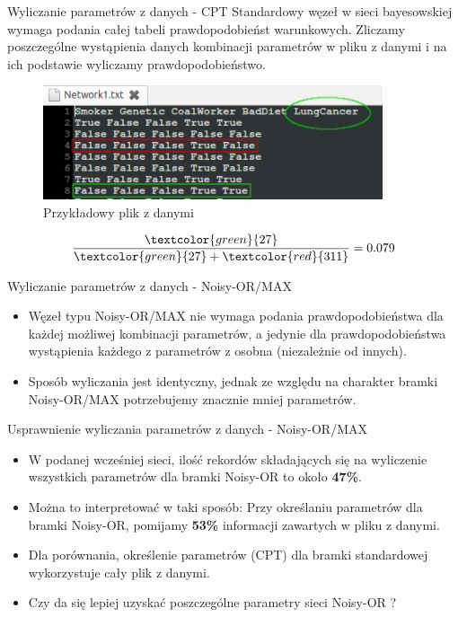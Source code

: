 \documentclass{beamer}
\begin{document}
\begin{frame}{Wyliczanie parametrów z danych - CPT}
	Standardowy węzeł w sieci bayesowskiej wymaga podania całej tabeli prawdopodobieńst warunkowych. 
	Zliczamy poszczególne wystąpienia danych kombinacji parametrów w pliku z danymi i na ich podstawie wyliczamy prawdopodobieństwo.

	\begin{figure}[h!]
		\centering
		\includegraphics[width=10cm]{4.png}
		\caption{Przykładowy plik z danymi}
	\end{figure}
	\begin{equation}
	\frac{\textcolor{green}{27}}{\textcolor{green}{27} + \textcolor{red}{311}} = 0.079
	\end{equation}
\end{frame}	
\begin{frame}{Wyliczanie parametrów z danych - Noisy-OR/MAX}
	\begin{itemize}
		\item Węzeł typu Noisy-OR/MAX nie wymaga podania prawdopodobieństwa dla każdej możliwej kombinacji parametrów, a jedynie dla prawdopodobieństwa wystąpienia każdego z parametrów z osobna (niezależnie od innych).
		\item Sposób wyliczania jest identyczny, jednak ze względu na charakter bramki Noisy-OR/MAX potrzebujemy znacznie mniej parametrów.
	\end{itemize}
\end{frame}

\begin{frame}{Usprawnienie wyliczania parametrów z danych - Noisy-OR/MAX}
	\begin{itemize}
		\item W podanej wcześniej sieci, ilość rekordów składających się na wyliczenie wszystkich parametrów dla bramki Noisy-OR to około \textbf{47\%}.
		\item Można to interpretować w taki sposób: Przy określaniu parametrów dla bramki Noisy-OR, pomijamy \textbf{53\%} informacji zawartych w pliku z danymi.
		\item Dla porównania, określenie parametrów (CPT) dla bramki standardowej wykorzystuje cały plik z danymi.
		\pause \item Czy da się lepiej uzyskać poszczególne parametry sieci Noisy-OR ?
	\end{itemize}
\end{frame}
\end{document}
